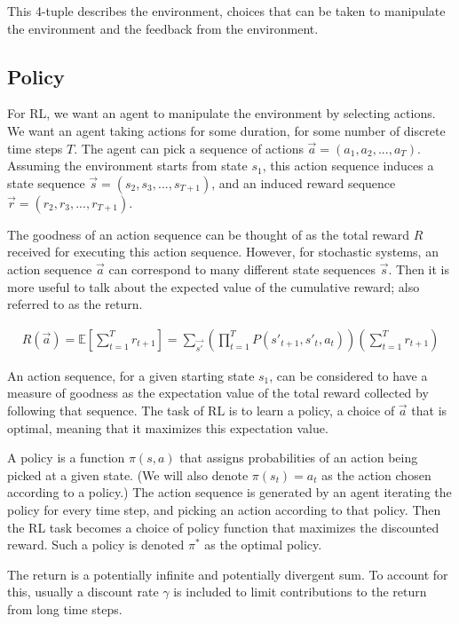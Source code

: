 \documentclass[../dissertation.tex]{subfiles}
\begin{document}
This 4-tuple describes the environment, choices that can be taken to manipulate the environment and the feedback from the environment.

\subsection{Policy}

For RL, we want an agent to manipulate the environment by selecting actions.
We want an agent taking actions for some duration, for some number of discrete time steps $T$.
The agent can pick a sequence of actions $\vec{a} = (a_1, a_2, ..., a_T)$.
Assuming the environment starts from state $s_1$, this action sequence induces a state sequence $\vec{s} = (s_2, s_3, ..., s_{T+1})$,
and an induced reward sequence $\vec{r} = (r_2, r_3, ..., r_{T+1})$.

The goodness of an action sequence can be thought of as the total reward $R$ received for executing this action sequence.
However, for stochastic systems, an action sequence $\vec{a}$ can correspond to many different state sequences $\vec{s}$.
Then it is more useful to talk about the expected value of the cumulative reward; also referred to as the return.

\begin{align}
    \label{eqn:returnDef}
    R(\vec{a}) = \mathbb{E} \left[
        \sum_{t=1}^{T} r_{t+1}
    \right]
    =   \sum_{\vec{s'}} 
            \left( \prod_{t=1}^{T} P(s'_{t+1}, s'_t, a_t) \right)
            \left( \sum_{t=1}^{T} r_{t+1} \right)
\end{align}

An action sequence, for a given starting state $s_1$, can be considered to have a measure of goodness as the expectation value of the total reward collected by following that sequence.
The task of RL is to learn a policy, a choice of $\vec{a}$ that is optimal, meaning that it maximizes this expectation value.

A policy is a function $\pi(s,a)$ that assigns probabilities of an action being picked at a given state.
(We will also denote $\pi(s_t) = a_t$ as the action chosen according to a policy.)
The action sequence is generated by an agent iterating the policy for every time step, and picking an action according to that policy.
Then the RL task becomes a choice of policy function that maximizes the discounted reward.
Such a policy is denoted $\pi^*$ as the optimal policy.

The return is a potentially infinite and potentially divergent sum.
To account for this, usually a discount rate $\gamma$ is included to limit contributions to the return from long time steps.
\end{document}

